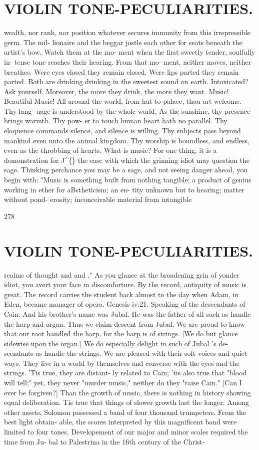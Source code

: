 \documentclass{article}
\begin{document}
\section*{VIOLIN TONE-PECULIARITIES.}
wealth, nor rank, nor position whatever secures immunity from this irrepressible germ. The mil- lionaire and the beggar jostle each other for seats beneath the artist's bow. Watch them at the mo- ment when the first sweetly tender, soulfully in- tense tone reaches their hearing. From that mo- ment, neither moves, neither breathes. Were eyes closed they remain closed. Were lips parted they remain parted. Both are drinking drinking in the sweetest sound on earth. Intoxicated? Ask yourself. Moreover, the more they drink, the more they want. Music! Beautiful Music! All around the world, from hut to palace, thou art welcome. Thy lang- uage is understood by the whole world. As the sunshine, thy presence brings warmth. Thy pow- er to touch human heart hath no parallel. Thy eloquence commands silence, and silence is willing. Thy subjects pass beyond mankind even unto the animal kingdom. Thy worship is boundless, and endless, even as the throbbing of hearts. What is music? For one thing, it is a demonstration for J\textasciicircum\{\} the ease with which the grinning idiot may question the sage. Thinking perchance you may be a sage, and not seeing danger ahead, you begin with: "Music is something built from nothing tangible; a product of genius working in ether for aBstheticism; an en- tity unknown but to hearing; matter without pond- erosity; inconceivable material from intangible

278

\section*{VIOLIN TONE-PECULIARITIES.}
realms of thought and and ." As you glance at the broadening grin of yonder idiot, you avert your face in discomforture. By the record, antiquity of music is great. The record carries the student back almost to the day when Adam, in Eden, became manager of opera. Genesis iv:21. Speaking of the descendants of Cain: And his brother's name was Jubal. He was the father of all such as handle the harp and organ. Thus we claim descent from Jubal. We are proud to know that our root handled the harp, for the harp is of strings. [We do but glance sidewise upon the organ.] We do especially delight in such of Jubal 's de- scendants as handle the strings. We are pleased with their soft voices and quiet ways. They live in a world by themselves and converse with the eyes and the strings. 'Tis true, they are distant- ly related to Cain; 'tis also true that "blood will tell;" yet, they never "murder music," neither do they "raise Cain." [Can I ever be forgiven?] Than the growth of music, there is nothing in history showing equal deliberation. Tis true that things of slower growth last the longer. Among other assets, Solomon possessed a band of four thousand trumpeters. From the best light obtain- able, the scores interpreted by this magnificent band were limited to four tones. Developement of our major and minor scales required the time from Ju- bal to Palestrina in the 16th century of the Christ-
\end{document}
